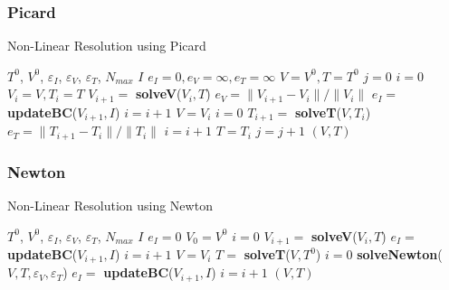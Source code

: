\subsubsection{Picard}
\begin{algorithm}[H]
  \caption{Non-Linear Resolution using Picard}
  \label{algo:et-picard}
  \begin{algorithmic}
    \REQUIRE $T^0$, $V^0$, $\varepsilon_I$, $\varepsilon_V$, $\varepsilon_T$,
    $N_{max}$
    \ENSURE $I$
    \STATE $e_I=0, e_V=\infty, e_T=\infty$
    \STATE $V=V^0,T=T^0$
    \STATE $j=0$
    \vspace{0.3cm}
    \REPEAT
      \STATE $i=0$
      \STATE $V_i=V,T_i=T$
      \REPEAT
        \STATE $V_{i+1} =$ \textbf{solveV}($V_i,T$)
        \STATE $e_V = \parallel V_{i+1}-V_i\parallel / \parallel V_i\parallel$
          \STATE $e_I =$ \textbf{updateBC}($V_{i+1},I$)
        \ENDIF
        \STATE $i = i+1$
      \STATE $V=V_i$
      \STATE $i=0$
      \REPEAT
        \STATE $T_{i+1} =$ \textbf{solveT}($V,T_i$)
        \STATE $e_T = \parallel T_{i+1}-T_i\parallel / \parallel T_i\parallel$
        \STATE $i=i+1$
      \STATE $T=T_i$
      \STATE $j=j+1$
    \RETURN $(V,T)$
  \end{algorithmic}
\end{algorithm}

\subsubsection{Newton}
\begin{algorithm}[H]
  \caption{Non-Linear Resolution using Newton}
  \label{algo:et-newton}
  \begin{algorithmic}
    \REQUIRE $T^0$, $V^0$, $\varepsilon_I$, $\varepsilon_V$, $\varepsilon_T$,
    $N_{max}$
    \ENSURE $I$
    \STATE $e_I=0$
    \STATE $V_0=V^0$
    \STATE $i=0$
    \vspace{0.3cm}
    \REPEAT
      \STATE $V_{i+1} =$ \textbf{solveV}($V_i,T$)
        \STATE $e_I =$ \textbf{updateBC}($V_{i+1},I$)
      \ENDIF
      \STATE $i=i+1$
    \STATE $V=V_i$
    \STATE $T =$ \textbf{solveT}($V,T^0$)
    \STATE $i=0$
    \REPEAT
    \STATE \textbf{solveNewton}($V,T,\varepsilon_V,\varepsilon_T$)
        \STATE $e_I =$ \textbf{updateBC}($V_{i+1},I$)
      \ENDIF
      \STATE $i=i+1$
    \RETURN $(V,T)$
  \end{algorithmic}
\end{algorithm}
